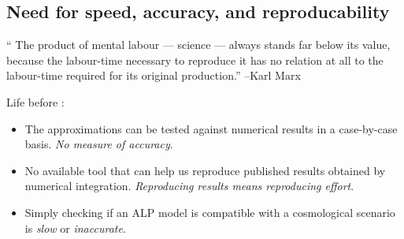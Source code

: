 \documentclass[10pt,utf8,compress,xcolor=dvipsnames]{beamer}
\begin{document}
\subsection{Need for speed, accuracy, and reproducability}
\begin{frame}{\insertsubsectionhead}

	\begin{center}
		`` The product of mental labour --- science --- always stands far below its value, because the labour-time necessary to 
		reproduce it has no relation at all to the labour-time required for its original production.''
		\flushright --Karl Marx %
	\end{center}


	Life before \mimes: \\[0cm]\pause
	\begin{itemize}
		\item The approximations can be tested against numerical results in a case-by-case basis. \emph{No measure of accuracy}.\pause%
		\item No available tool that can help us reproduce published results obtained by numerical integration. \emph{Reproducing results means reproducing effort}.\pause
		\item Simply checking if an ALP model is compatible with a cosmological scenario is \emph{slow} or \emph{inaccurate}. 
	\end{itemize}
	
	
	
\end{frame}




\section{\mimes}
\end{document}
